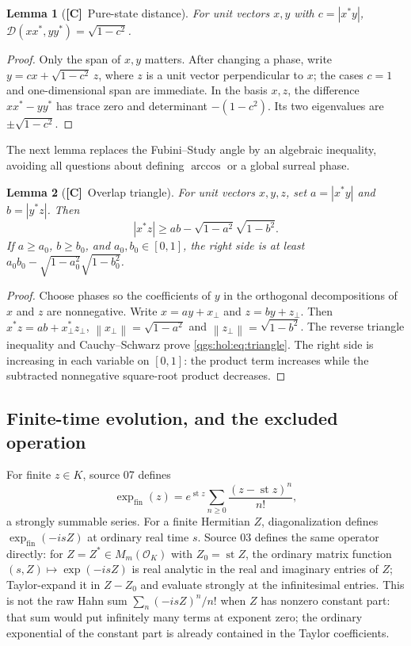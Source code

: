 \documentclass[11pt,oneside]{article}
\numberwithin{equation}{section}
\theoremstyle{plain}
\newtheorem{lemma}[lemma]{Lemma}
\theoremstyle{definition}
\theoremstyle{remark}
\newcommand{\OO}{\mathcal O}
\newcommand{\TD}{\mathcal D}
\newcommand{\expfin}{\exp_{\mathrm{fin}}}
\DeclareMathOperator{\st}{st}
\newcommand{\abs}[1]{\left|#1\right|}
\newcommand{\norm}[1]{\left\|#1\right\|}
\newcommand{\TC}{\textcolor{TierC}{\textsf{\bfseries[C]}}}
\begin{document}
\begin{lemma}[\TC\ Pure-state distance]\label{qgs:hol:lem:puredistance}
For unit vectors $x,y$ with $c=\abs{x^*y}$, $\TD(xx^*,yy^*)=\sqrt{1-c^2}$.
\end{lemma}
\begin{proof}
Only the span of $x,y$ matters. After changing a phase, write $y=cx+\sqrt{1-c^2}\,z$, where $z$ is a unit vector perpendicular to $x$; the cases $c=1$ and one-dimensional span are immediate. In the basis $x,z$, the difference $xx^*-yy^*$ has trace zero and determinant $-(1-c^2)$. Its two eigenvalues are $\pm\sqrt{1-c^2}$.
\end{proof}

The next lemma replaces the Fubini--Study angle by an algebraic inequality, avoiding all questions about defining $\arccos$ or a global surreal phase.

\begin{lemma}[\TC\ Overlap triangle]\label{qgs:hol:lem:triangle}
For unit vectors $x,y,z$, set $a=\abs{x^*y}$ and $b=\abs{y^*z}$. Then
\begin{equation}\label{qgs:hol:eq:triangle}
 \abs{x^*z}\geq ab-\sqrt{1-a^2}\sqrt{1-b^2}.
\end{equation}
If $a\geq a_0$, $b\geq b_0$, and $a_0,b_0\in[0,1]$, the right side is at least $a_0b_0-\sqrt{1-a_0^2}\sqrt{1-b_0^2}$.
\end{lemma}
\begin{proof}
Choose phases so the coefficients of $y$ in the orthogonal decompositions of $x$ and $z$ are nonnegative. Write $x=ay+x_\perp$ and $z=by+z_\perp$. Then $x^*z=ab+x_\perp^*z_\perp$, $\norm{x_\perp}=\sqrt{1-a^2}$ and $\norm{z_\perp}=\sqrt{1-b^2}$. The reverse triangle inequality and Cauchy--Schwarz prove \eqref{qgs:hol:eq:triangle}. The right side is increasing in each variable on $[0,1]$: the product term increases while the subtracted nonnegative square-root product decreases.
\end{proof}

\subsection{Finite-time evolution, and the excluded operation}\label{qgs:sec:expfin}
For finite $z\in K$, source 07 defines
\begin{equation}\label{qgs:eq:expf}
 \expfin(z)=e^{\st z}\sum_{n\ge0}\frac{(z-\st z)^n}{n!},
\end{equation}
a strongly summable series. For a finite Hermitian $Z$, diagonalization defines $\expfin(-isZ)$ at ordinary real time $s$. Source 03 defines the same operator directly: for $Z=Z^*\in M_m(\OO_K)$ with $Z_0=\st Z$, the ordinary matrix function $(s,Z)\mapsto\exp(-isZ)$ is real analytic in the real and imaginary entries of $Z$; Taylor-expand it in $Z-Z_0$ and evaluate strongly at the infinitesimal entries. This is not the raw Hahn sum $\sum_n(-isZ)^n/n!$ when $Z$ has nonzero constant part: that sum would put infinitely many terms at exponent zero; the ordinary exponential of the constant part is already contained in the Taylor coefficients.
\end{document}

